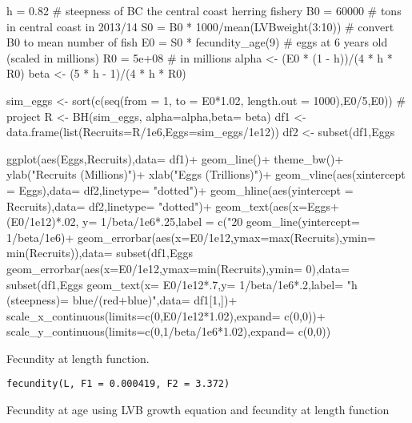 \documentclass[letterpaper]{book}
\begin{document}
%
\begin{Examples}
\begin{ExampleCode}
h = 0.82                              # steepness of BC the central coast herring fishery
B0 = 60000                            # tons in central coast in 2013/14
S0 = B0 * 1000/mean(LVBweight(3:10))  # convert B0 to mean number of fish
E0 = S0 * fecundity_age(9)            # eggs at 6 years old (scaled in millions)
R0 = 5e+08                            # in millions
alpha <- (E0 * (1 - h))/(4 * h * R0)
beta <- (5 * h - 1)/(4 * h * R0)

sim_eggs <- sort(c(seq(from = 1, to = E0*1.02, length.out = 1000),E0/5,E0))   # project 
R <- BH(sim_eggs, alpha=alpha,beta= beta)
df1 <- data.frame(list(Recruits=R/1e6,Eggs=sim_eggs/1e12))
df2 <- subset(df1,Eggs%

ggplot(aes(Eggs,Recruits),data= df1)+
  geom_line()+
  theme_bw()+
  ylab("Recruits (Millions)")+
  xlab("Eggs (Trillions)")+
  geom_vline(aes(xintercept = Eggs),data= df2,linetype= "dotted")+
  geom_hline(aes(yintercept = Recruits),data= df2,linetype= "dotted")+
  geom_text(aes(x=Eggs+(E0/1e12)*.02, y= 1/beta/1e6*.25,label = c("20%
  geom_line(yintercept= 1/beta/1e6)+
  geom_errorbar(aes(x=E0/1e12,ymax=max(Recruits),ymin= min(Recruits)),data= subset(df1,Eggs%
  geom_errorbar(aes(x=E0/1e12,ymax=min(Recruits),ymin= 0),data= subset(df1,Eggs%
  geom_text(x= E0/1e12*.7,y= 1/beta/1e6*.2,label= "h (steepness)= blue/(red+blue)",data= df1[1,])+
  scale_x_continuous(limits=c(0,E0/1e12*1.02),expand= c(0,0))+
  scale_y_continuous(limits=c(0,1/beta/1e6*1.02),expand= c(0,0))

\end{ExampleCode}
\end{Examples}
%
\begin{Description}\relax
Fecundity at length function.
\end{Description}
%
\begin{Usage}
\begin{verbatim}
fecundity(L, F1 = 0.000419, F2 = 3.372)
\end{verbatim}
\end{Usage}
%
\begin{Description}\relax
Fecundity at age using LVB growth equation and fecundity at length function
\end{Description}
\end{document}

